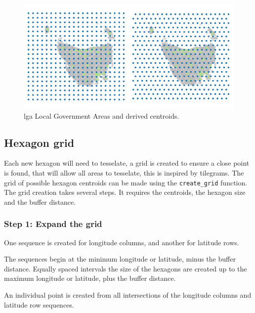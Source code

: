 \begin{Schunk}
\begin{figure}
\includegraphics{algorithmRjournal_files/figure-latex/unnamed-chunk-3-1} \caption[lga Local Government Areas and derived centroids]{lga Local Government Areas and derived centroids.}\label{fig:unnamed-chunk-3}
\end{figure}
\end{Schunk}

\hypertarget{hexagon-grid}{%
\subsection{Hexagon grid}\label{hexagon-grid}}

Each new hexagon will need to tesselate, a grid is created to ensure a
close point is found, that will allow all areas to tesselate, this is
inspired by tilegrams. The grid of possible hexagon centroids can be
made using the \texttt{create\_grid} function. The grid creation takes
several steps. It requires the centroids, the hexagon size and the
buffer distance.

\hypertarget{step-1-expand-the-grid}{%
\subsubsection{Step 1: Expand the grid}\label{step-1-expand-the-grid}}

One sequence is created for longitude columns, and another for latitude
rows.

The sequences begin at the minimum longitude or latitude, minus the
buffer distance. Equally spaced intervals the size of the hexagons are
created up to the maximum longitude or latitude, plus the buffer
distance.

An individual point is created from all intersections of the longitude
columns and latitude row sequences.

